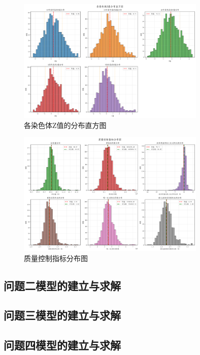 \documentclass[withoutpreface,bwprint]{cumcmthesis} %
\begin{document}
\begin{figure}[H]
    \centering
    \includegraphics[width=0.8\textwidth]{../figure/q1_3.png}
    \caption{各染色体Z值的分布直方图}
    \label{fig:heatmap}
\end{figure}

\begin{figure}[H]
    \centering
    \includegraphics[width=0.8\textwidth]{../figure/q1_4.png}
    \caption{质量控制指标分布图}
    \label{fig:heatmap}
\end{figure}





\subsection{问题二模型的建立与求解}

\subsection{问题三模型的建立与求解}

\subsection{问题四模型的建立与求解}
\end{document}
